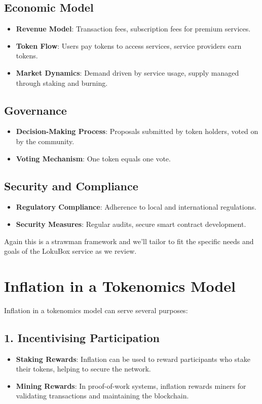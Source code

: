 \documentclass{tufte-handout}
\begin{document}
\subsection*{Economic Model}
\begin{itemize}
    \item \textbf{Revenue Model}: Transaction fees, subscription fees for premium services.
    \item \textbf{Token Flow}: Users pay tokens to access services, service providers earn tokens.
    \item \textbf{Market Dynamics}: Demand driven by service usage, supply managed through staking and burning.
\end{itemize}

\subsection*{Governance}
\begin{itemize}
    \item \textbf{Decision-Making Process}: Proposals submitted by token holders, voted on by the community.
    \item \textbf{Voting Mechanism}: One token equals one vote.
\end{itemize}

\subsection*{Security and Compliance}
\begin{itemize}
    \item \textbf{Regulatory Compliance}: Adherence to local and international regulations.
    \item \textbf{Security Measures}: Regular audits, secure smart contract development.
\end{itemize}

Again this is a strawman framework and we'll tailor to fit the specific needs and goals of the LokuBox service as we review.

\section*{Inflation in a Tokenomics Model}

Inflation in a tokenomics model can serve several purposes:

\subsection*{1. Incentivising Participation}
\begin{itemize}
    \item \textbf{Staking Rewards}: Inflation can be used to reward participants who stake their tokens, helping to secure the network.
    \item \textbf{Mining Rewards}: In proof-of-work systems, inflation rewards miners for validating transactions and maintaining the blockchain.
\end{itemize}
\end{document}
